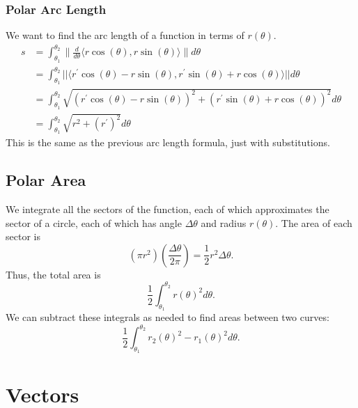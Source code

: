 \documentclass[12pt]{article}
\theoremstyle{plain} %
\theoremstyle{definition}
\theoremstyle{definition}
\theoremstyle{remark}
\begin{document}
\subsubsection{Polar Arc Length}
We want to find the arc length of a function in terms of $r(\theta)$.
\begin{align*}
    s & = \int_{\theta_1}^{\theta_2}{\lVert \frac{d}{d\theta} \langle r\cos{(\theta)}, r\sin{(\theta)} \rangle \rVert d\theta} \\
    & = \int_{\theta_1}^{\theta_2}{|| \langle r^\prime\cos{(\theta)} - r\sin{(\theta)}, r^\prime\sin{(\theta)} + r\cos{(\theta)} \rangle || d\theta} \\
    & = \int_{\theta_1}^{\theta_2}{\sqrt{ (r^\prime\cos{(\theta)} - r\sin{(\theta)})^2+ (r^\prime\sin{(\theta)} + r\cos{(\theta)})^2  } d\theta} \\
    & = \int_{\theta_1}^{\theta_2}{\sqrt{r^2+ (r^\prime)^2}d\theta}
\end{align*}
This is the same as the previous arc length formula, just with substitutions.

\subsection{Polar Area}
We integrate all the sectors of the function, each of which approximates the sector of a circle,
each of which has angle $\Delta \theta$ and radius $r(\theta)$. The area of each sector is
\begin{equation*}
    (\pi r^2)(\frac{\Delta\theta}{2\pi}) = \frac{1}{2}r^2 \Delta\theta.
\end{equation*}
Thus, the total area is
\[
    \frac{1}{2} \int_{\theta_1}^{\theta_2}{r(\theta)^2 d\theta}.
\]
We can subtract these integrals as needed to find areas between two curves:
\[
    \frac{1}{2} \int_{\theta_1}^{\theta_2}{r_2(\theta)^2 - r_1(\theta)^2 d\theta}.
\]

\section{Vectors}
\end{document}
